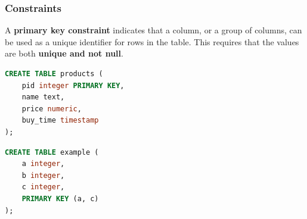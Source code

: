 \subsubsection{Constraints}
A \textbf{primary key constraint} indicates that a column, or a group of columns, can be used as a unique identifier for rows in the table. This requires that the values are both \textbf{unique and not null}. \vspace{.2cm}\\
\begin{minipage}{.5\textwidth}
\begin{lstlisting}[language=SQL]
CREATE TABLE products (
	pid integer PRIMARY KEY,
	name text,
	price numeric,
	buy_time timestamp
);
\end{lstlisting}
\end{minipage}\hfill
\begin{minipage}{.45\textwidth}
\begin{lstlisting}[language=SQL]
CREATE TABLE example (
	a integer,
	b integer,
	c integer,
	PRIMARY KEY (a, c)
);
\end{lstlisting}
\end{minipage}

